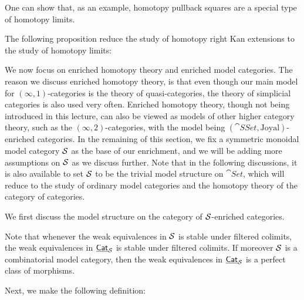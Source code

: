 One can show that, as an example, homotopy pullback squares are a special type of homotopy limits.

The following proposition reduce the study of homotopy right Kan extensions to the study of homotopy limits:


We now focus on enriched homotopy theory and enriched model categories. The reason we discuss enriched homotopy theory, is that even though
our main model for $(\infty,1)$-categories is the theory of quasi-categories, the theory of simplicial categories is also used very often. 
Enriched homotopy theory, though not being introduced in this lecture, can also be viewed as models of other higher category theory, such as 
the $(\infty,2)$-categories, with the model being $(\cat{SSet},\text{Joyal})$-enriched categories. In the remaining of this section, we fix 
a symmetric monoidal model category $\mathcal{S}$ as the base of our enrichment, and we will be adding more assumptions on $\mathcal{S}$ as we discuss further.
Note that in the following discussions, it is also available to set $\mathcal{S}$ to be the trivial model structure on $\cat{Set}$, which will reduce
to the study of ordinary model categories and the homotopy theory of the category of categories.

We first discuss the model structure on the category of $\mathcal{S}$-enriched categories.


Note that whenever the weak equivalences in $\mathcal{S}$ is stable under filtered colimits, the weak equivalences in $\underline{\smash{\mathsf{Cat}}}_{\mathcal{S}}$
is stable under filtered colimits. If moreover $\mathcal{S}$ is a combinatorial model category, then the weak equivalences in $\underline{\smash{\mathsf{Cat}}}_{\mathcal{S}}$
is a perfect class of morphisms.

Next, we make the following definition:


\tbc

